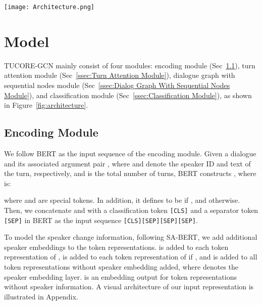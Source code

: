 \documentclass[11pt]{article}
\begin{document}
\begin{figure*}
\begin{center}
\texttt{[image: Architecture.png]}
\end{center}
\caption{The overall architecture of TUCORE-GCN. First, A contextualized representation of each token is obtained by feeding the input dialogue to the context encoder. Next, Masked Multi-Head Attention using surrounding turn mask is applied to obtain representations that enhance the meaning of each turn. Then, TUCORE-GCN constructs a dialogue graph and applies GCN mechanism combined with BiLSTM. Finally, the classification module predicts relations using information from the previous module.}
\label{fig:architecture}
\end{figure*}


\section{Model}
TUCORE-GCN mainly consist of four modules: encoding module (Sec~\ref{ssec:Encoding Module}), turn attention module (Sec~\ref{ssec:Turn Attention Module}), dialogue graph with sequential nodes module (Sec~\ref{ssec:Dialog Graph With Sequential Nodes Module}), and classification module (Sec~\ref{ssec:Classification Module}), as shown in Figure~\ref{fig:architecture}. 


\subsection{Encoding Module}
\label{ssec:Encoding Module}
We follow BERT \citep{yu-etal-2020-dialogue} as the input sequence of the encoding module. Given a dialogue  and its associated argument pair , where  and  denote the speaker ID and text of the  turn, respectively, and  is the total number of turns, BERT constructs , where  is:

where  and  are special tokens. In addition, it defines  to be \texttt{} if , and  otherwise. Then, we concatenate  and  with a classification token \texttt{[CLS]} and a separator token \texttt{[SEP]} in BERT\citep{devlin-etal-2019-bert} as the input sequence \texttt{[CLS][SEP][SEP][SEP]}.

To model the speaker change information, following SA-BERT\citep{gu2020speaker}, we add additional speaker embeddings to the token representations.  is added to each token representation of ,  is added to each token representation of  if , and  is added to all token representations without speaker embedding added, where  denotes the speaker embedding layer.  is an embedding output for token representations without speaker information. A visual architecture of our input representation is illustrated in Appendix.
\end{document}
